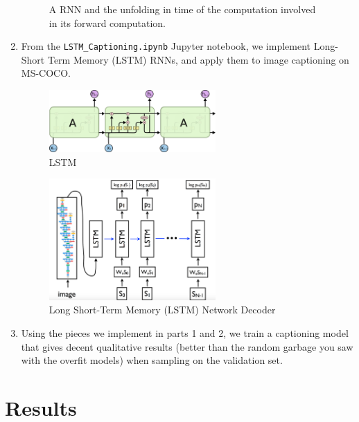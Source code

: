 \documentclass[english]{article}
\begin{document}
\begin{enumerate}
\begin{figure}[H]
          \caption{A RNN and the unfolding in time of the computation involved in its forward computation.}
\end{figure}
\item From the \texttt{LSTM\_Captioning.ipynb} Jupyter notebook, we implement Long-Short Term Memory (LSTM) RNNs, and apply them to image captioning on MS-COCO.
\begin{figure}[H]
          \centering
          \includegraphics[width=0.6\textwidth]{Picture4.png}
          \caption{LSTM}
\end{figure}
\begin{figure}[H]
          \centering
          \includegraphics[width=0.6\textwidth]{Picture3.png}
          \caption{Long Short-Term Memory (LSTM) Network Decoder}
\end{figure}
\item Using the pieces we implement in parts 1 and 2, we train a captioning model that gives decent qualitative results (better than the random garbage you saw with the overfit models) when sampling on the validation set.
\end{enumerate}

\section{Results}
\end{document}
